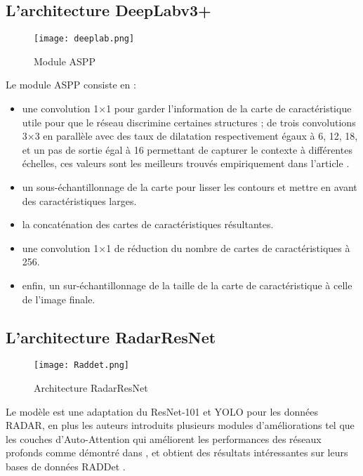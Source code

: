 \subsection{L'architecture DeepLabv3+}
\begin{figure}[hbt!]
  \centering
  \texttt{[image: deeplab.png]}
  \caption{Module ASPP \cite{48}}
\end{figure}
Le module ASPP consiste en : 
\begin{itemize}
  \item une convolution 1×1 pour garder l'information de la carte de caractéristique utile pour que le réseau discrimine certaines structures ; de trois convolutions 3×3 en parallèle avec des taux de dilatation respectivement égaux à 6, 12, 18, et un pas de sortie égal à 16 permettant de capturer le contexte à différentes échelles, ces valeurs sont les meilleurs trouvés empiriquement dans l’article \cite{53}.
  \item un sous-échantillonnage de la carte pour lisser les contours et mettre en avant des caractéristiques larges.
  \item la concaténation des cartes de caractéristiques résultantes.
  \item une convolution 1×1 de réduction du nombre de cartes de caractéristiques à 256.
  \item enfin, un sur-échantillonnage de la taille de la carte de caractéristique à celle de l’image finale.
\end{itemize}
\newpage
\subsection{L'architecture RadarResNet}

\begin{figure}[hbt!]
  \centering
  \texttt{[image: Raddet.png]}
  \caption{Architecture RadarResNet \cite{32}}
\end{figure}

Le modèle est une adaptation du ResNet-101 \cite{50} et YOLO \cite{26} pour les données RADAR, en plus les auteurs introduits plusieurs modules d'améliorations tel que les couches d'Auto-Attention qui améliorent les performances des réseaux profonds comme démontré dans \cite{54}, et obtient des résultats intéressantes sur leurs bases de données RADDet \cite{32}.

